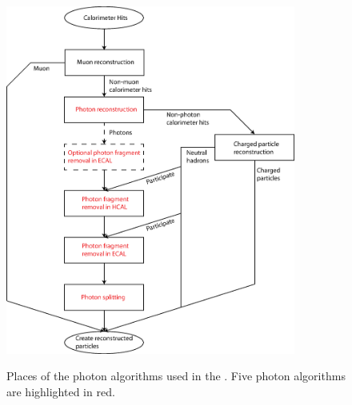 \begin{figure}[tbph]
\centering
{\includegraphics[width=0.85\textwidth]{photon/photonAlgs3}}
\caption[A flow diagram of the \PhotonReconstruction algorithm.]
{Places of the photon algorithms used  in the \pandora. Five photon algorithms are highlighted in red.}
\label{fig:photonPhotonAlgs}
\end{figure}




